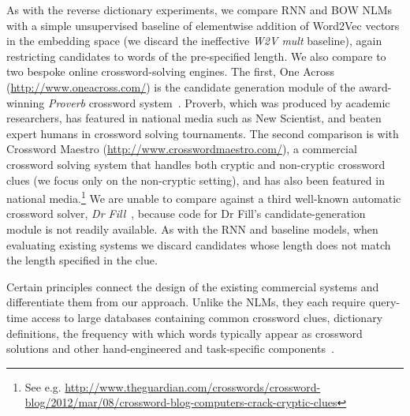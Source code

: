 \documentclass[11pt,letterpaper]{article}
\begin{document}
As with the reverse dictionary experiments, we compare RNN and BOW NLMs with a
simple unsupervised baseline of elementwise addition of Word2Vec vectors in the
embedding space (we discard the ineffective \emph{W2V mult} baseline), again
restricting candidates to words of the pre-specified length. We also compare to
two bespoke online crossword-solving engines. The first, One Across
(\url{http://www.oneacross.com/}) is the candidate generation module of the
award-winning \emph{Proverb} crossword system~\cite{littman2002probabilistic}.
Proverb, which was produced by academic researchers, has featured in national
media such as New Scientist, and beaten expert humans in crossword solving
tournaments. The second comparison is with Crossword Maestro
(\url{http://www.crosswordmaestro.com/}), a commercial crossword solving system
that handles both cryptic and non-cryptic crossword clues (we focus only on the
non-cryptic setting), and has also been featured in national
media.\footnote{
    See e.g.
    \url{http://www.theguardian.com/crosswords/crossword-blog/2012/mar/08/crossword-blog-computers-crack-cryptic-clues}
}
We are unable to compare against a third well-known automatic crossword solver,
\emph{Dr Fill}~\cite{ginsberg2011dr}, because code for Dr Fill's
candidate-generation module is not readily available. As with the RNN and
baseline models, when evaluating existing systems we discard candidates whose
length does not match the length specified in the clue.  

Certain principles connect the design of the existing commercial systems and differentiate them from our approach. Unlike the NLMs, they each require query-time access to large databases containing common crossword clues, dictionary definitions, the frequency with which words typically appear as crossword solutions and other hand-engineered and task-specific components~\cite{littman2002probabilistic,ginsberg2011dr}. 
\end{document}
